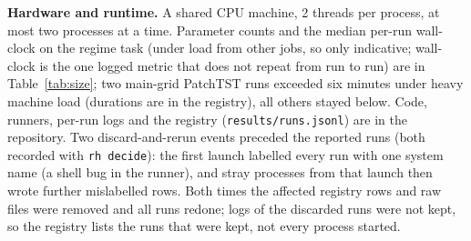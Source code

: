 \textbf{Hardware and runtime.} A shared CPU machine, 2 threads per process, at most two processes at a time. Parameter counts and the median per-run wall-clock on the regime task (under load from other jobs, so only indicative; wall-clock is the one logged metric that does not repeat from run to run) are in Table~\ref{tab:size}; two main-grid PatchTST runs exceeded six minutes under heavy machine load (durations are in the registry), all others stayed below. Code, runners, per-run logs and the registry (\texttt{results/runs.jsonl}) are in the repository. Two discard-and-rerun events preceded the reported runs (both recorded with \texttt{rh decide}): the first launch labelled every run with one system name (a shell bug in the runner), and stray processes from that launch then wrote further mislabelled rows. Both times the affected registry rows and raw files were removed and all runs redone; logs of the discarded runs were not kept, so the registry lists the runs that were kept, not every process started.

\begin{table}[t]\centering\caption{Model size and median wall-clock per run over the three seeds of the regime task (3 horizons, loaded machine) at 400 steps (main grid) and 2000 steps (budget sweep).}\label{tab:size}
\end{table}
